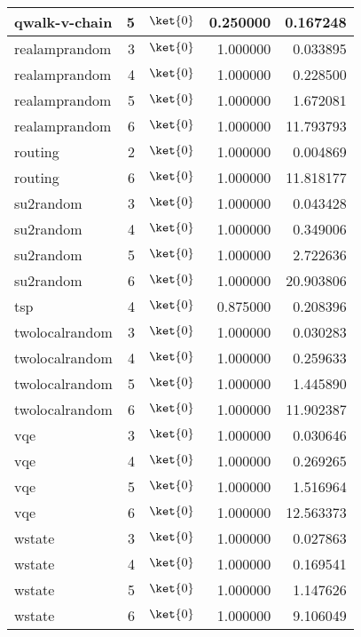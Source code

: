 \begin{table}
{{\begin{minipage}[t]{0.5\textwidth}
\begin{tabular}{lrlrr}
    qwalk-v-chain & 5 & $\ket{0}$ & 0.250000 & 0.167248 \\
    \midrule
    realamprandom & 3 & $\ket{0}$ & 1.000000 & 0.033895 \\
    realamprandom & 4 & $\ket{0}$ & 1.000000 & 0.228500 \\
    realamprandom & 5 & $\ket{0}$ & 1.000000 & 1.672081 \\
    realamprandom & 6 & $\ket{0}$ & 1.000000 & 11.793793 \\
    \midrule
    routing & 2 & $\ket{0}$ & 1.000000 & 0.004869 \\
    routing & 6 & $\ket{0}$ & 1.000000 & 11.818177 \\
    \midrule
    su2random & 3 & $\ket{0}$ & 1.000000 & 0.043428 \\
    su2random & 4 & $\ket{0}$ & 1.000000 & 0.349006 \\
    su2random & 5 & $\ket{0}$ & 1.000000 & 2.722636 \\
    su2random & 6 & $\ket{0}$ & 1.000000 & 20.903806 \\
    \midrule
    tsp & 4 & $\ket{0}$ & 0.875000 & 0.208396 \\
    \midrule
    twolocalrandom & 3 & $\ket{0}$ & 1.000000 & 0.030283 \\
    twolocalrandom & 4 & $\ket{0}$ & 1.000000 & 0.259633 \\
    twolocalrandom & 5 & $\ket{0}$ & 1.000000 & 1.445890 \\
    twolocalrandom & 6 & $\ket{0}$ & 1.000000 & 11.902387 \\
    \midrule
    vqe & 3 & $\ket{0}$ & 1.000000 & 0.030646 \\
    vqe & 4 & $\ket{0}$ & 1.000000 & 0.269265 \\
    vqe & 5 & $\ket{0}$ & 1.000000 & 1.516964 \\
    vqe & 6 & $\ket{0}$ & 1.000000 & 12.563373 \\
    \midrule
    wstate & 3 & $\ket{0}$ & 1.000000 & 0.027863 \\
    wstate & 4 & $\ket{0}$ & 1.000000 & 0.169541 \\
    wstate & 5 & $\ket{0}$ & 1.000000 & 1.147626 \\
    wstate & 6 & $\ket{0}$ & 1.000000 & 9.106049 \\
    \bottomrule
    \end{tabular}
    \end{minipage}}}
    \end{table}
